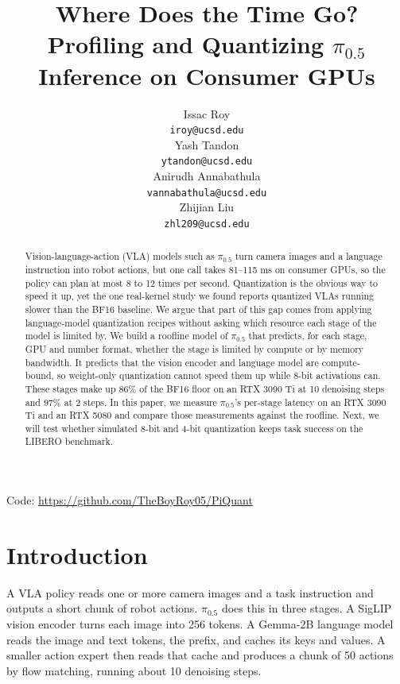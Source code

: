 \documentclass[12pt,letterpaper]{article}
\title{Where Does the Time Go? Profiling and Quantizing $\pi_{0.5}$ Inference on Consumer GPUs}
\author{Issac Roy \\
  {\tt iroy@ucsd.edu} \\\And
  Yash Tandon \\
  {\tt ytandon@ucsd.edu} \\\And
  Anirudh Annabathula \\
  {\tt vannabathula@ucsd.edu} \\\And
  Zhijian Liu \\
  {\tt zhl209@ucsd.edu} \\}
\begin{document}
\maketitle


\begin{abstract}
Vision-language-action (VLA) models such as $\pi_{0.5}$ turn camera images and a language instruction into robot actions, but one call takes 81--115 ms on consumer GPUs, so the policy can plan at most 8 to 12 times per second. Quantization is the obvious way to speed it up, yet the one real-kernel study we found reports quantized VLAs running slower than the BF16 baseline. We argue that part of this gap comes from applying language-model quantization recipes without asking which resource each stage of the model is limited by. We build a roofline model of $\pi_{0.5}$ that predicts, for each stage, GPU and number format, whether the stage is limited by compute or by memory bandwidth. It predicts that the vision encoder and language model are compute-bound, so weight-only quantization cannot speed them up while 8-bit activations can. These stages make up 86\% of the BF16 floor on an RTX 3090 Ti at 10 denoising steps and 97\% at 2 steps. In this paper, we measure $\pi_{0.5}$'s per-stage latency on an RTX 3090 Ti and an RTX 5080 and compare those measurements against the roofline. Next, we will test whether simulated 8-bit and 4-bit quantization keeps task success on the LIBERO benchmark.
\end{abstract}

\begin{center}
Code: \url{https://github.com/TheBoyRoy05/PiQuant}
\end{center}

\maketoc
\clearpage


\section{Introduction}

A VLA policy reads one or more camera images and a task instruction and outputs a short chunk of robot actions. $\pi_{0.5}$ \citep{intelligence2025pi05} does this in three stages. A SigLIP vision encoder turns each image into 256 tokens. A Gemma-2B language model reads the image and text tokens, the prefix, and caches its keys and values. A smaller action expert then reads that cache and produces a chunk of 50 actions by flow matching, running about 10 denoising steps.
\end{document}
